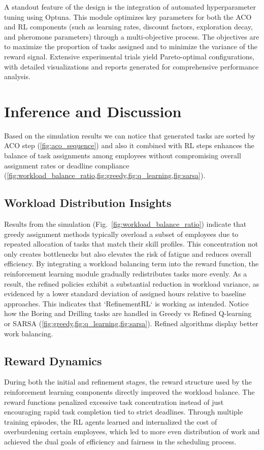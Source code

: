 \documentclass[%
aip,
cp,  %
reprint
]{revtex4-2}
\begin{document}
	A standout feature of the design is the integration of automated hyperparameter tuning using Optuna. This module optimizes key parameters for both the ACO and RL components (such as learning rates, discount factors, exploration decay, and pheromone parameters) through a multi-objective process. The objectives are to maximize the proportion of tasks assigned and to minimize the variance of the reward signal. Extensive experimental trials yield Pareto-optimal configurations, with detailed visualizations and reports generated for comprehensive performance analysis.
	
	\section{\label{sec:inference}Inference and Discussion}
	Based on the simulation results we can notice that generated tasks are sorted by ACO step (\cref{fig:aco_sequence}) and also it combined with RL steps enhances the balance of task assignments among employees without compromising overall
	assignment rates or deadline compliance (\cref{fig:workload_balance_ratio,fig:greedy,fig:q_learning,fig:sarsa}).
	
	\subsection{\label{subsec:workload}Workload Distribution Insights}
	Results from the simulation (Fig.~\ref{fig:workload_balance_ratio}) indicate that greedy assignment methods typically overload a subset of employees due to repeated allocation of tasks that match their skill profiles. This concentration not only creates bottlenecks but also elevates the risk of fatigue and reduces overall efficiency. By integrating a workload balancing term into the reward function, the reinforcement learning module gradually redistributes tasks more evenly. As a result, the refined policies exhibit a substantial
	reduction in workload variance, as evidenced by a lower standard deviation of
	assigned hours relative to baseline approaches. This indicates that `RefinementRL` is working as intended. Notice how the Boring and Drilling tasks are handled in Greedy vs Refined Q-learning or SARSA  (\cref{fig:greedy,fig:q_learning,fig:sarsa}). Refined algorithms display better work balancing.
	
	\subsection{\label{subsec:rationale}Reward Dynamics}
	During both the initial and refinement stages, the reward structure used by the reinforcement learning components directly improved the workload balance. The reward functions penalized excessive task concentration instead of just encouraging rapid task completion tied to strict deadlines. Through multiple training episodes, the RL agents learned and internalized the cost of overburdening certain employees, which led to more even distribution of work and achieved the dual goals of efficiency and fairness in the scheduling process.
	
\end{document}
